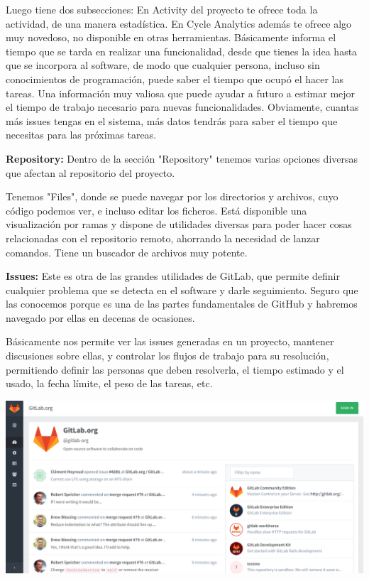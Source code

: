 \begin{itemize}
Luego tiene dos subsecciones: En Activity del proyecto te ofrece toda la actividad, de una manera estadística. En Cycle Analytics además te ofrece algo muy novedoso, no disponible en otras herramientas. Básicamente informa el tiempo que se tarda en realizar una funcionalidad, desde que tienes la idea hasta que se incorpora al software, de modo que cualquier persona, incluso sin conocimientos de programación, puede saber el tiempo que ocupó el hacer las tareas. Una información muy valiosa que puede ayudar a futuro a estimar mejor el tiempo de trabajo necesario para nuevas funcionalidades. Obviamente, cuantas más issues tengas en el sistema, más datos tendrás para saber el tiempo que necesitas para las próximas tareas.

           \textbf {Repository:}
Dentro de la sección "Repository" tenemos varias opciones diversas que afectan al repositorio del proyecto.

Tenemos "Files", donde se puede navegar por los directorios y archivos, cuyo código podemos ver, e incluso editar los ficheros. Está disponible una visualización por ramas y dispone de utilidades diversas para poder hacer cosas relacionadas con el repositorio remoto, ahorrando la necesidad de lanzar comandos. Tiene un buscador de archivos muy potente.


           \textbf {Issues:}
Este es otra de las grandes utilidades de GitLab, que permite definir cualquier problema que se detecta en el software y darle seguimiento. Seguro que las conocemos porque es una de las partes fundamentales de GitHub y habremos navegado por ellas en decenas de ocasiones.

Básicamente nos permite ver las issues generadas en un proyecto, mantener discusiones sobre ellas, y controlar los flujos de trabajo para su resolución, permitiendo definir las personas que deben resolverla, el tiempo estimado y el usado, la fecha límite, el peso de las tareas, etc.

      

	\begin{center}
	\includegraphics[width=17cm]{./Imagenes/image3} 
	\end{center}


\end{itemize} 